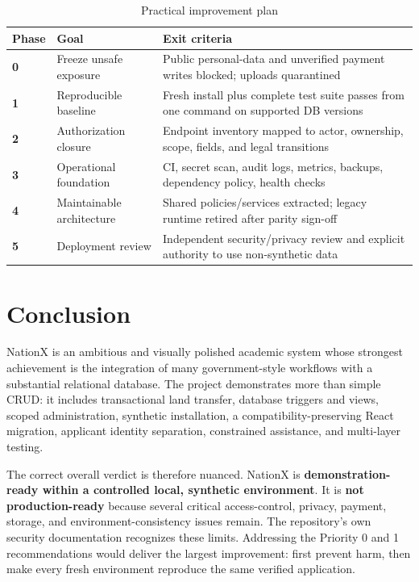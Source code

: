 \documentclass[12pt,a4paper,oneside]{report}
\begin{document}
\begin{table}[htbp]
\centering
\caption{Practical improvement plan}
\begin{tabularx}{\textwidth}{>{\bfseries}p{} p{} X}
\toprule
Phase & Goal & Exit criteria\\
\midrule
0 & Freeze unsafe exposure & Public personal-data and unverified payment writes blocked; uploads quarantined\\
1 & Reproducible baseline & Fresh install plus complete test suite passes from one command on supported DB versions\\
2 & Authorization closure & Endpoint inventory mapped to actor, ownership, scope, fields, and legal transitions\\
3 & Operational foundation & CI, secret scan, audit logs, metrics, backups, dependency policy, health checks\\
4 & Maintainable architecture & Shared policies/services extracted; legacy runtime retired after parity sign-off\\
5 & Deployment review & Independent security/privacy review and explicit authority to use non-synthetic data\\
\bottomrule
\end{tabularx}
\end{table}

\chapter{Conclusion}

NationX is an ambitious and visually polished academic system whose strongest achievement is the
integration of many government-style workflows with a substantial relational database. The
project demonstrates more than simple CRUD: it includes transactional land transfer, database
triggers and views, scoped administration, synthetic installation, a compatibility-preserving
React migration, applicant identity separation, constrained assistance, and multi-layer testing.

The correct overall verdict is therefore nuanced. NationX is \textbf{demonstration-ready within a
controlled local, synthetic environment}. It is \textbf{not production-ready} because several
critical access-control, privacy, payment, storage, and environment-consistency issues remain. The
repository's own security documentation recognizes these limits. Addressing the Priority 0 and 1
recommendations would deliver the largest improvement: first prevent harm, then make every fresh
environment reproduce the same verified application.
\end{document}
